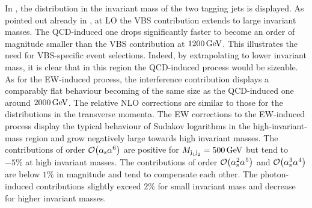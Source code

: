 \documentclass[a4article,11pt]{article}
\begin{document}
In , the distribution in the
invariant mass of the two tagging jets is displayed.  As pointed out
already in , at LO the VBS contribution
extends to large invariant masses. 
The QCD-induced one drops significantly faster to become an order of
magnitude smaller than the VBS contribution at $1200\,\text{GeV}$.  This
illustrates the need for VBS-specific event selections.  Indeed, by
extrapolating to lower invariant mass, it is clear that in this region
the QCD-induced process would be sizeable.  As for the EW-induced
process, the interference contribution displays a comparably flat
behaviour becoming of the same size as the QCD-induced one around
$2000\,\text{GeV}$.  The relative NLO corrections are similar to those for the
distributions in the transverse momenta.
The EW corrections to the EW-induced process display the typical
behaviour of Sudakov logarithms in the high-invariant-mass region and
grow negatively large towards high invariant masses.  The contributions
of order $\mathcal{O}{\left(\alpha_\text{s}\alpha^{6}\right)}$ are positive
for $M_{\text{j}_1\text{j}_2}=500\,\text{GeV}$ but tend to $-5\%$ at high invariant
masses.  The contributions of order
$\mathcal{O}{\left(\alpha_\text{s}^{2}\alpha^{5}\right)}$ and
$\mathcal{O}{\left(\alpha_\text{s}^{3}\alpha^{4}\right)}$ are below $1\%$ in
magnitude and tend to compensate each other.
The photon-induced contributions slightly exceed $2\%$ for small
invariant mass and decrease for higher invariant masses.
\end{document}
